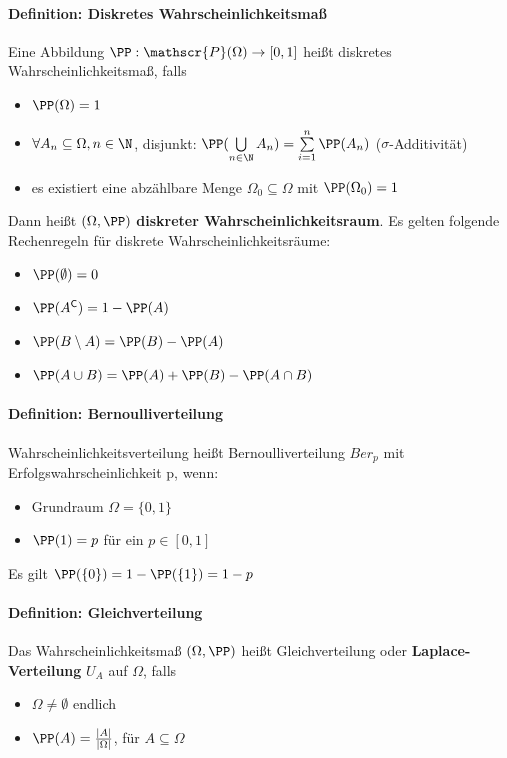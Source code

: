 \paragraph{Definition: Diskretes Wahrscheinlichkeitsmaß} 
Eine Abbildung $\PP:\mathscr{P}(\Omega) \rightarrow [0,1]$ heißt diskretes Wahrscheinlichkeitsmaß, falls
\begin{itemize}
	\item $\PP(\Omega)=1$
	\item $\forall A_n \subseteq \Omega, n\in\N$, disjunkt: $\PP(\bigcup\limits_{n\in \N} A_n)=\sum\limits_{i=1}^{n} \PP(A_n)$ \null\hfill($\sigma$-Additivität)
	\item es existiert eine abzählbare Menge $\Omega_0\subseteq\Omega$ mit $\PP(\Omega_0)=1$
\end{itemize}
Dann heißt $(\Omega, \PP)$ \textbf{diskreter Wahrscheinlichkeitsraum}.
Es gelten folgende Rechenregeln für diskrete Wahrscheinlichkeitsräume:
\begin{itemize}
	\item $\PP(\emptyset)=0$
	\item $\PP(A^{\mathsf{C}})=1-\PP(A)$
	\item $\PP(B\setminus A) = \PP(B)-\PP(A)$
	\item $\PP(A\cup B)=\PP(A)+\PP(B)-\PP(A\cap B)$
\end{itemize}

\paragraph{Definition: Bernoulliverteilung}
Wahrscheinlichkeitsverteilung heißt Bernoulliverteilung $Ber_p$ mit Erfolgswahrscheinlichkeit p, wenn:
\begin{itemize}
	\item Grundraum $\Omega={\{0,1\}}$
	\item $\PP(1)=p$ für ein $p\in[0,1]$
\end{itemize}
Es gilt $\PP(\{0\})=1-\PP(\{1\})=1-p$

\paragraph{Definition: Gleichverteilung}
Das Wahrscheinlichkeitsmaß $(\Omega,\PP)$ heißt Gleichverteilung oder \textbf{Laplace-Verteilung} $U_A$ auf $\Omega$, falls
\begin{itemize}
	\item $\Omega\neq\emptyset$ endlich
	\item $\PP(A)=\frac{|A|}{|\Omega|}$, für $A\subseteq\Omega$
\end{itemize}


